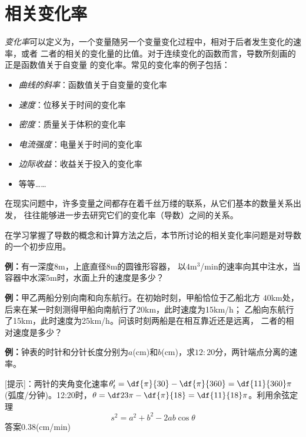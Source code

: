 \section{相关变化率}

{\it 变化率}可以定义为，一个变量随另一个变量变化过程中，相对于后者发生变化的速率，或者
二者的相关的变化量的比值。对于连续变化的函数而言，导数所刻画的正是函数值关于自变量
的变化率。常见的变化率的例子包括：

\begin{itemize}
  \setlength{\itemindent}{1cm}
  \item {\it 曲线的斜率}：函数值关于自变量的变化率 
  \item {\it 速度}：位移关于时间的变化率 
  \item {\it 密度}：质量关于体积的变化率 
  \item {\it 电流强度}：电量关于时间的变化率 
  \item {\it 边际收益}：收益关于投入的变化率 
  \item 等等{\ldots\ldots} 
\end{itemize}

在现实问题中，许多变量之间都存在着千丝万缕的联系，从它们基本的数量关系出发，
往往能够进一步去研究它们的变化率（导数）之间的关系。

在学习掌握了导数的概念和计算方法之后，本节所讨论的相关变化率问题是对导数
的一个初步应用。

{\bf 例：}有一深度$8$m，上底直径$8$m的圆锥形容器，
以$4$m$^3$/min的速率向其中注水，当容器中水深$5$m时，水面上升的速度是多少？

{\bf 例：}甲乙两船分别向南和向东航行。在初始时刻，甲船恰位于乙船北方
$40$km处，后来在某一时刻测得甲船向南航行了20km，此时速度为15km/h；
乙船向东航行了15km，此时速度为25km/h。问该时刻两船是在相互靠近还是远离，
二者的相对速度是多少？

% 

{\bf 例：}钟表的时针和分针长度分别为$a$(cm)和$b$(cm)，求$12:20$分，两针端点分离的速率。

[提示]：两针的夹角变化速率$\theta'_t=\df{\pi}{30}-\df{\pi}{360}
=\df{11}{360}\pi$(弧度/分钟)。12:20时，$\theta=\df23\pi-\df{\pi}{18}
=\df{11}{18}\pi$。利用余弦定理
$$s^2=a^2+b^2-2ab\cos\theta$$
答案$0.38$(cm/min)

